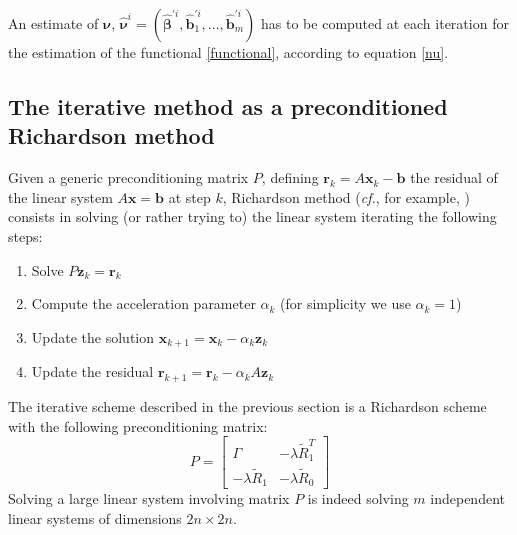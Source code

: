 An estimate of $\bm{\nu}$, $\hat{\bm{\nu}}^i = (\hat{\bm{\beta}}^{\prime i},
	\hat{\bm{b}}_1^{\prime i}, \dots, \hat{\bm{b}}_m^{\prime i})$ has to be
computed at each iteration for the estimation of the functional
\ref{functional}, according to equation \ref{nu}.

\subsection{The iterative method as a preconditioned Richardson method}
Given a generic preconditioning matrix $P$, defining $\bm{r}_k=A \bm{x}_k -
	\bm{b}$ the residual of the linear system $A \bm{x} = \bm{b}$ at step $k$,
Richardson method (\textit{cf.}, for example, \cite{Quarteroni}) consists in
solving (or rather trying to) the linear system iterating the following steps:
\begin{enumerate}
	\item Solve $P \bm{z}_k = \bm{r}_k$
	\item Compute the acceleration parameter $\alpha_k$ (for simplicity we use $\alpha_k = 1$)
	\item Update the solution $ \bm{x}_{k+1} = \bm{x}_{k} - \alpha_k \bm{z}_k $
	\item Update the residual $\bm{r}_{k+1} = \bm{r}_{k} - \alpha_k A \bm{z}_k$
\end{enumerate}

The iterative scheme described in the previous section is a Richardson scheme
with the following preconditioning matrix:
\begin{equation}
	\label{precond}
	P=
	\begin{bmatrix}
		\Gamma               & -\lambda \tilde{R}_1^T \\
		-\lambda \tilde{R}_1 & -\lambda \tilde{R}_0
	\end{bmatrix}
\end{equation}
Solving a large linear system involving matrix $P$ is indeed solving
$m$ independent linear systems of dimensions $2n\times 2n$.
